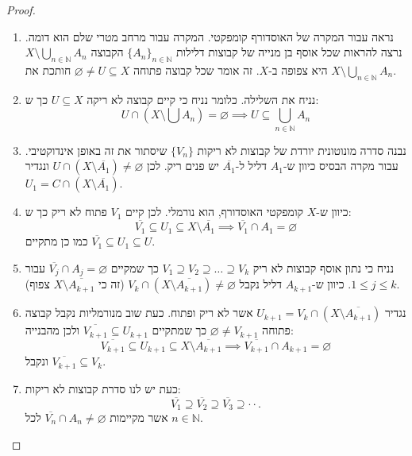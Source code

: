 \documentclass{tstextbook}
\begin{document}
\begin{proof}
  \begin{enumerate}
    \item נראה עבור המקרה של האוסדורף קומפקטי. המקרה עבור מרחב מטרי שלם הוא דומה. נרצה להראות שכל אוסף בן מנייה של קבוצות דלילות \(\{ A_{n} \}_{n \in \mathbb{N}}\) הקבוצה \(X \setminus \bigcup_{n \in \mathbb{N}}A_{n}\) היא צפופה ב-\(X\). זה אומר שכל קבוצה פתוחה \(\varnothing \neq U\subseteq X\) חותכת את \(X\setminus \bigcup_{n \in \mathbb{N}}A_{n}\).  


    \item נניח את השלילה. כלומר נניח כי קיים קבוצה לא ריקה \(U\subseteq X\) כך ש: 
$$U\cap\left(X\setminus\bigcup A_{n}\right)=\varnothing \implies U\subseteq \bigcup_{n \in \mathbb{N}} A_{n} $$


    \item נבנה סדרה מונוטונית יורדת של קבוצות לא ריקות \(\{ V_{n} \}\) שיסתור את זה באופן אינדוקטיבי. עבור מקרה הבסיס כיוון ש-\(A_{1}\) דליל ל-\(\overline{A_{1}}\) יש פנים ריק. לכן \(U\cap \left( X \setminus  \overline{A_{1}}  \right)\neq \varnothing\) ונגדיר \(U_{1}=C\cap \left( X \setminus \overline{A_{1}} \right)\). 


    \item כיוון ש-\(X\) קומפקטי האוסדורף, הוא נורמלי. לכן קיים \(V_{1}\) פתוח לא ריק כך ש: 
$$\overline{{{V_{1}}}}\subseteq U_{1}\subseteq X\setminus\overline{{{A_{1}}}}\implies\overline{{{V_{1}}}}\cap A_{1}=\varnothing$$
כמו כן מתקיים \(\overline{V_{1}}\subseteq U_{1}\subseteq U\).


    \item נניח כי נתון אוסף קבוצות לא ריק \(V_{1}\supseteq V_{2} \supseteq \dots \supseteq V_{k}\) כך שמקיים \(\overline{V_{j}}\cap A_{j}=\varnothing\) עבור \(1\leq j\leq k\). כיוון ש-\(A_{k+1}\) דליל נקבל \(V_{k}\cap\left(X\setminus{\overline{{A_{k+1}}}}\right)\neq \varnothing\) (זה כי \(X\setminus \overline{A_{k+1}}\) צפוף). 


    \item נגדיר \(U_{k+1}=V_{k}\cap \left( X \setminus \overline{A_{k+1}} \right)\) אשר לא ריק ופתוח. כעת שוב מנורמליות נקבל קבוצה פתוחה \(\varnothing\neq V_{k+1}\) כך שמתקיים \({\overline{{V_{k+1}}}}\subseteq U_{k+1}\) ולכן מהבנייה: 
$$\overline{{{V_{k+1}}}}\subseteq U_{k+1}\subseteq X\setminus\overline{{{A_{k+1}}}}\implies\overline{{{V_{k+1}}}}\cap A_{k+1}=\varnothing $$
ונקבל \(\overline{V_{k+1}}\subseteq V_{k}\).


    \item כעת יש לנו סדרת קבוצות לא ריקות: 
$$\overline{{{V_{1}}}}\supseteq\overline{{{V_{2}}}}\supseteq\overline{{{V_{3}}}}\supseteq\cdot\cdot.$$
אשר מקיימות \(\overline{V_{n}}\cap A_{n}\neq \varnothing\) לכל \(n \in \mathbb{N}\).



\end{enumerate}
\end{proof}
\end{document}
